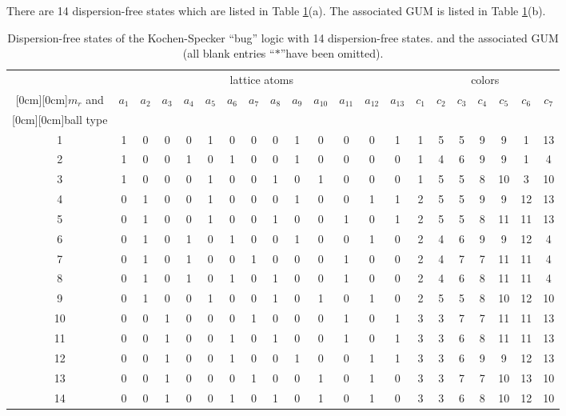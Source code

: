 There are 14 dispersion-free states which are listed in Table \ref{2001-cesena-t2}(a).
The associated GUM is listed in Table \ref{2001-cesena-t2}(b).
\begin{table}
\normalsize
\begin{center}
{
\setlength{\tabcolsep}{3pt}
\begin{tabular}{|c|ccccccccccccc||ccccccc|}
\hline\hline
&\multicolumn{13}{c||}{lattice atoms}&\multicolumn{7}{|c|}{colors}\\
\raisebox{1.5ex}[0cm][0cm]{$m_r$ and}&$a_1$&$a_2$&$a_3$&$a_4$&$a_5$&$a_6$&$a_7$&$a_8$&$a_9$&$a_{10}$&$a_{11}$&$a_{12}$&$a_{13}$&$c_1$&$c_2$&$c_3$&$c_4$&$c_5$&$c_6$&$c_7$\\
\raisebox{1.5ex}[0cm][0cm]{ball type}&&&&&&&&&&&&&&&&&&&&\\
\hline
1  &1&0&0&0&1&0&0&0&1&0&0&0&1&  1&5&5&9&9 &1 &13        \\
2  &1&0&0&1&0&1&0&0&1&0&0&0&0&  1&4&6&9&9 &1 &4         \\
3  &1&0&0&0&1&0&0&1&0&1&0&0&0&  1&5&5&8&10&3 &10        \\
4  &0&1&0&0&1&0&0&0&1&0&0&1&1&  2&5&5&9&9 &12&13        \\
5  &0&1&0&0&1&0&0&1&0&0&1&0&1&  2&5&5&8&11&11&13        \\
6  &0&1&0&1&0&1&0&0&1&0&0&1&0&  2&4&6&9&9 &12&4         \\
7  &0&1&0&1&0&0&1&0&0&0&1&0&0&  2&4&7&7&11&11&4         \\
8  &0&1&0&1&0&1&0&1&0&0&1&0&0&  2&4&6&8&11&11&4         \\
9  &0&1&0&0&1&0&0&1&0&1&0&1&0&  2&5&5&8&10&12&10        \\
10 &0&0&1&0&0&0&1&0&0&0&1&0&1&  3&3&7&7&11&11&13        \\
11 &0&0&1&0&0&1&0&1&0&0&1&0&1&  3&3&6&8&11&11&13        \\
12 &0&0&1&0&0&1&0&0&1&0&0&1&1&  3&3&6&9&9 &12&13        \\
13 &0&0&1&0&0&0&1&0&0&1&0&1&0&  3&3&7&7&10&13&10        \\
14 &0&0&1&0&0&1&0&1&0&1&0&1&0&  3&3&6&8&10&12&10        \\
\hline\hline
\end{tabular}
}
\end{center}
\normalsize
\caption{Dispersion-free states  of the Kochen-Specker ``bug'' logic with 14 dispersion-free states.
and the associated GUM (all blank entries ``$\ast$''have been omitted).
\label{2001-cesena-t2}}
\end{table}

